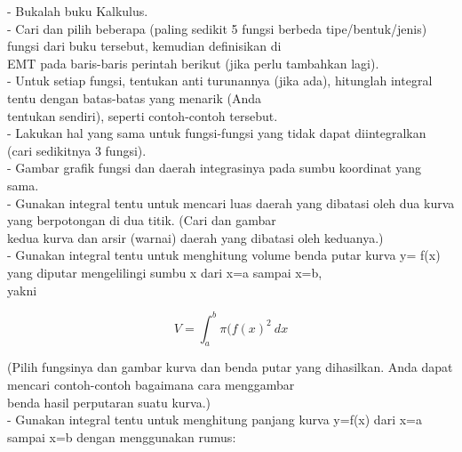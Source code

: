 \documentclass{article}
\begin{document}
\begin{eulernotebook}
\begin{eulercomment}
\begin{eulercomment}
\begin{eulercomment}
\begin{eulercomment}
\begin{eulercomment}
\begin{eulercomment}
\begin{eulercomment}
\begin{eulercomment}
\begin{eulercomment}
\begin{eulercomment}
\begin{eulercomment}
\begin{eulercomment}
\begin{eulercomment}
\begin{eulercomment}
\begin{eulercomment}
\begin{eulercomment}
\begin{eulercomment}
\begin{eulercomment}
\begin{eulercomment}
\begin{eulercomment}
\begin{eulercomment}
\begin{eulercomment}
\begin{eulercomment}
\begin{eulercomment}
\begin{eulercomment}
- Bukalah buku Kalkulus.\\
- Cari dan pilih beberapa (paling sedikit 5 fungsi berbeda
tipe/bentuk/jenis) fungsi dari buku tersebut, kemudian definisikan di\\
EMT pada baris-baris perintah berikut (jika perlu tambahkan lagi).\\
- Untuk setiap fungsi, tentukan anti turunannya (jika ada), hitunglah
integral tentu dengan batas-batas yang menarik (Anda\\
tentukan sendiri), seperti contoh-contoh tersebut.\\
- Lakukan hal yang sama untuk fungsi-fungsi yang tidak dapat
diintegralkan (cari sedikitnya 3 fungsi).\\
- Gambar grafik fungsi dan daerah integrasinya pada sumbu koordinat
yang sama.\\
- Gunakan integral tentu untuk mencari luas daerah yang dibatasi oleh
dua kurva yang berpotongan di dua titik. (Cari dan gambar\\
kedua kurva dan arsir (warnai) daerah yang dibatasi oleh keduanya.)\\
- Gunakan integral tentu untuk menghitung volume benda putar kurva y=
f(x) yang diputar mengelilingi sumbu x dari x=a sampai x=b,\\
yakni

\end{eulercomment}
\begin{eulerformula}
\[
V = \int_a^b \pi (f(x)^2\ dx
\]
\end{eulerformula}
\begin{eulercomment}
(Pilih fungsinya dan gambar kurva dan benda putar yang dihasilkan.
Anda dapat mencari contoh-contoh bagaimana cara menggambar\\
benda hasil perputaran suatu kurva.)\\
- Gunakan integral tentu untuk menghitung panjang kurva y=f(x) dari
x=a sampai x=b dengan menggunakan rumus:


\end{eulercomment}
\end{eulercomment}
\end{eulercomment}
\end{eulercomment}
\end{eulercomment}
\end{eulercomment}
\end{eulercomment}
\end{eulercomment}
\end{eulercomment}
\end{eulercomment}
\end{eulercomment}
\end{eulercomment}
\end{eulercomment}
\end{eulercomment}
\end{eulercomment}
\end{eulercomment}
\end{eulercomment}
\end{eulercomment}
\end{eulercomment}
\end{eulercomment}
\end{eulercomment}
\end{eulercomment}
\end{eulercomment}
\end{eulercomment}
\end{eulercomment}
\end{eulernotebook}
\end{document}
